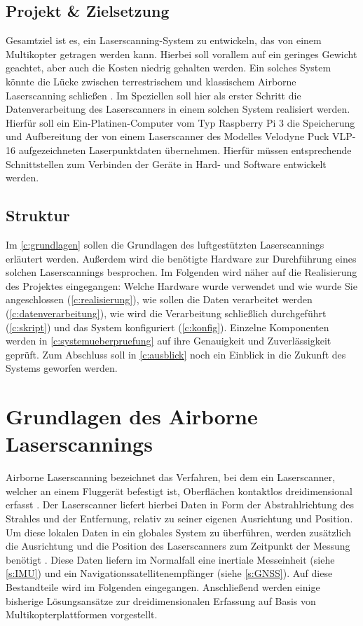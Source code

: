 \documentclass[a4paper,12pt,bibliography=totoc, listof=totoc,titlepage,pointlessnumbers]{scrreprt}
\begin{document}
\section{Projekt \& Zielsetzung}
Gesamtziel ist es, ein Laser\-scan\-ning-System zu entwickeln, das von einem Multikopter getragen werden kann. Hierbei soll vorallem auf ein geringes Gewicht geachtet, aber auch die Kosten niedrig gehalten werden. Ein solches System könnte die Lücke zwischen terrestrischem und klassischem Air\-borne Laser\-scan\-ning schließen \citep[S. 21f]{uav}. Im Speziellen soll hier als erster Schritt die Datenverarbeitung des Laser\-scan\-ners in einem solchen System realisiert werden. Hierfür soll ein Ein-Platinen-Computer vom Typ Rasp\-berry Pi 3 die Speicherung und Aufbereitung der von einem Laser\-scan\-ner des Modelles Velodyne Puck VLP-16 aufgezeichneten Laserpunktdaten übernehmen. Hierfür müssen entsprechende Schnittstellen zum Verbinden der Geräte in Hard- und Software entwickelt werden.

\section{Struktur}
Im \autoref{c:grundlagen} sollen die Grundlagen des luftgestützten Laser\-scan\-nings erläutert werden. Außerdem wird die benötigte Hardware zur Durchführung eines solchen Laser\-scan\-nings besprochen. Im Folgenden wird näher auf die Realisierung des Projektes eingegangen: Welche Hardware wurde verwendet und wie wurde Sie angeschlossen (\autoref{c:realisierung}), wie sollen die Daten verarbeitet werden (\autoref{c:datenverarbeitung}), wie wird die Verarbeitung schließlich durchgeführt (\autoref{c:skript}) und das System konfiguriert (\autoref{c:konfig}). Einzelne Komponenten werden in \autoref{c:systemueberpruefung} auf ihre Genauigkeit und Zuverlässigkeit geprüft. Zum Abschluss soll in \autoref{c:ausblick} noch ein Einblick in die Zukunft des Systems geworfen werden.

\chapter{Grundlagen des Air\-borne Laser\-scan\-nings}
\label{c:grundlagen}

Air\-borne Laser\-scan\-ning bezeichnet das Verfahren, bei dem ein Laser\-scan\-ner, welcher an einem Fluggerät befestigt ist, Oberflächen kontaktlos dreidimensional erfasst \citep[S. 1]{beraldin}. Der Laser\-scan\-ner liefert hierbei Daten in Form der Abstrahlrichtung des Strahles und der Entfernung, relativ zu seiner eigenen Ausrichtung und Position. Um diese lokalen Daten in ein globales System zu überführen, werden zusätzlich die Ausrichtung und die Position des Laser\-scan\-ners zum Zeitpunkt der Messung benötigt \citep[S. 22f]{beraldin}. Diese Daten liefern im Normalfall eine inertiale Messeinheit (siehe \autoref{s:IMU}) und ein Navigationssatellitenempfänger (siehe \autoref{s:GNSS}). Auf diese Bestandteile wird im Folgenden eingegangen. Anschließend werden einige bisherige Lösungsansätze zur dreidimensionalen Erfassung auf Basis von Multikopterplattformen vorgestellt.
\end{document}
